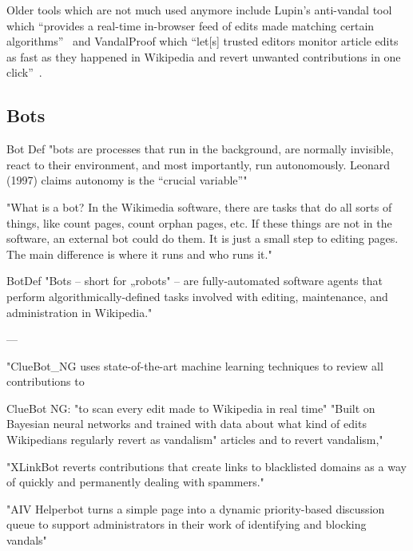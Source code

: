 
Older tools which are not much used anymore include Lupin's anti-vandal tool which
``provides a real-time in-browser feed of edits made matching certain algorithms''~\cite{GeiRib2010}
and VandalProof which
``let[s] trusted editors monitor article edits as fast as they happened in Wikipedia and revert unwanted contributions in one click''~\cite{HalRied2012}.


\subsection{Bots}

\cite{Livingstone2016}
Bot Def
"bots are processes that run in the background, are normally
invisible, react to their environment, and most importantly, run autonomously. Leonard (1997) claims autonomy
is the “crucial variable”"

"What is a bot?
In the Wikimedia software, there are tasks that do all sorts of things, like count pages, count orphan pages, etc.
If these things are not in the software, an external bot could do them. It is just a small step to editing pages. The
main difference is where it runs and who runs it."

\cite{GeiRib2010}
BotDef
"Bots – short for „robots" – are fully-automated software
agents that perform algorithmically-defined tasks involved
with editing, maintenance, and administration in Wikipedia."

---

"ClueBot\_NG uses state-of-the-art machine learning techniques to review all contributions to

ClueBot NG:
\cite{GeiHal2013}
"to scan every edit made to Wikipedia in real time"
"Built on Bayesian neural networks and trained with data
about what kind of edits Wikipedians regularly revert as
vandalism"
articles and to revert vandalism,"~\cite{HalRied2012}

"XLinkBot reverts contributions that create links to
blacklisted domains as a way of quickly and permanently dealing with spammers."~\cite{HalRied2012}

"AIV Helperbot turns a simple page into a dynamic
priority-based discussion queue to support administrators in their work of identifying and
blocking vandals"~\cite{HalRied2012}


